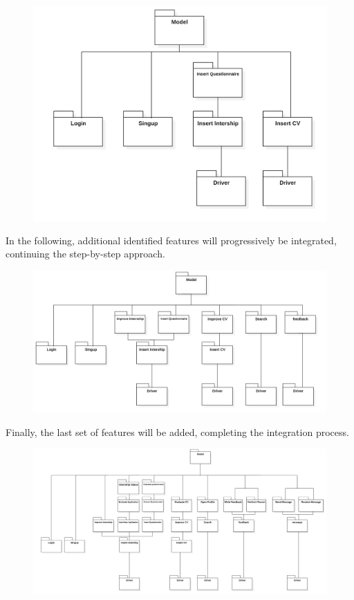 \begin{figure}[H]
    \centering
    \includegraphics[width=0.75\linewidth]{DD/Images/Implementation Images/insert.png}
    \label{fig:enter-label}
\end{figure}

In the following, additional identified features will progressively be integrated, continuing the step-by-step approach.

\begin{figure}[H]
    \centering
    \includegraphics[width=1\linewidth]{DD//Images//Implementation Images/improvement search and feedback.png}
    \label{fig:enter-label}
\end{figure}

Finally, the last set of features will be added, completing the integration process.

\begin{figure}[H]
    \centering
    \includegraphics[width=1\linewidth]{DD//Images//Implementation Images/finalwithnomanagers.png}
    \label{fig:enter-label}
\end{figure}


